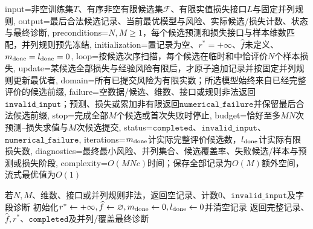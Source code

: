 \begin{AlgorithmContract}{
  input={非空训练集$T$、有序非空有限候选集$\mathcal F$、有限实值损失接口$L$与固定并列规则},
  output={最后合法候选记录、当前最优模型与风险、实际候选/损失计数、状态与最终诊断},
  preconditions={$N,M\ge1$，每个候选预测和损失接口与样本维数匹配，并列规则预先冻结},
  initialization={置记录为空、$r^*=+\infty$、$\widehat f$未定义、$m_{\rm done}=l_{\rm done}=0$},
  loop={按候选次序扫描，每个候选在临时和中恰评价$N$个样本损失},
  update={某候选全部损失与经验风险有限后，才原子追加记录并按固定并列规则更新最优者},
  domain={所有已提交风险为有限实数；所选模型始终来自已经完整评价的候选前缀},
  failure={空数据/候选、维数、接口或规则非法返回$\mathtt{invalid\_input}$；预测、损失或累加非有限返回$\mathtt{numerical\_failure}$并保留最后合法候选前缀},
  stop={完成全部$M$个候选或首次失败时停止},
  budget={恰好至多$MN$次预测--损失求值与$M$次候选提交},
  status={$\mathtt{completed}$、$\mathtt{invalid\_input}$、$\mathtt{numerical\_failure}$},
  iterations={$m_{\rm done}$计实际完整评价候选数，$l_{\rm done}$计实际有限损失数},
  diagnostics={最终最小风险、并列集合、候选覆盖率、失败候选/样本与预测或损失阶段},
  complexity={$O(MNc)$时间；保存全部记录为$O(M)$额外空间，流式最优值为$O(1)$}
}
\begin{algorithm}[H]
\caption{有限假设空间的经验风险选择}\label{alg:V1-C09-finite-erm}
若$N,M$、维数、接口或并列规则非法，返回空记录、计数$0$、$\mathtt{invalid\_input}$及字段诊断\;
初始化$r^*\leftarrow+\infty,\widehat f\leftarrow\varnothing,m_{\rm done}\leftarrow0,l_{\rm done}\leftarrow0$并清空记录\;
返回完整记录、$\widehat f,r^*$、$\mathtt{completed}$及并列/覆盖最终诊断\;
\end{algorithm}
\end{AlgorithmContract}

